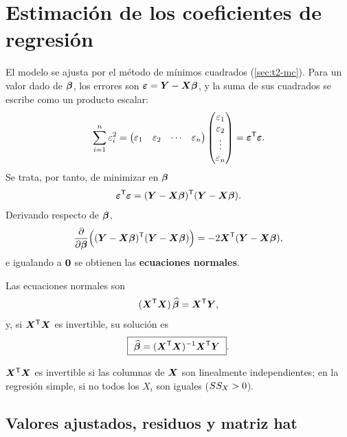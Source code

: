 \section{Estimación de los coeficientes de regresión}
\label{sec:t5-estimacion}

El modelo se ajusta por el método de mínimos cuadrados (\cref{sec:t2-mc}). Para un valor dado de
$\bm{\beta}$, los errores son $\bm{\varepsilon}=\bm{Y}-\bm{X}\bm{\beta}$, y la suma de
sus cuadrados se escribe como un producto escalar:
\[
  \sum_{i=1}^{n} \varepsilon_i^2 =
  \begin{pmatrix} \varepsilon_1 & \varepsilon_2 & \cdots & \varepsilon_n \end{pmatrix}
  \begin{pmatrix} \varepsilon_1\\ \varepsilon_2\\ \vdots\\ \varepsilon_n \end{pmatrix}
  = \bm{\varepsilon}^{\mathsf{T}}\bm{\varepsilon} .
\]
Se trata, por tanto, de minimizar en $\bm{\beta}$
\[
  \bm{\varepsilon}^{\mathsf{T}}\bm{\varepsilon} = (\bm{Y}-\bm{X}\bm{\beta})^{\mathsf{T}}(\bm{Y}-\bm{X}\bm{\beta}) .
\]
Derivando respecto de $\bm{\beta}$,
\[
  \frac{\partial}{\partial\bm{\beta}}
  \Big((\bm{Y}-\bm{X}\bm{\beta})^{\mathsf{T}}(\bm{Y}-\bm{X}\bm{\beta})\Big)
  = -2\bm{X}^{\mathsf{T}}(\bm{Y}-\bm{X}\bm{\beta}),
\]
e igualando a $\bm{0}$ se obtienen las \textbf{ecuaciones normales}.

\begin{teorema}
  Las ecuaciones normales son
  \[
    (\bm{X}^{\mathsf{T}}\bm{X})\,\widehat{\bm{\beta}} = \bm{X}^{\mathsf{T}}\bm{Y},
  \]
  y, si $\bm{X}^{\mathsf{T}}\bm{X}$ es invertible, su solución es
  \[
    \boxed{\ \widehat{\bm{\beta}} = (\bm{X}^{\mathsf{T}}\bm{X})^{-1}\bm{X}^{\mathsf{T}}\bm{Y}\ } .
  \]
\end{teorema}

\begin{nota}
  $\bm{X}^{\mathsf{T}}\bm{X}$ es invertible si las columnas de $\bm{X}$ son linealmente independientes; en la
  regresión simple, si no todos los $X_i$ son iguales ($SS_X>0$).
\end{nota}

\subsection{Valores ajustados, residuos y matriz hat}


